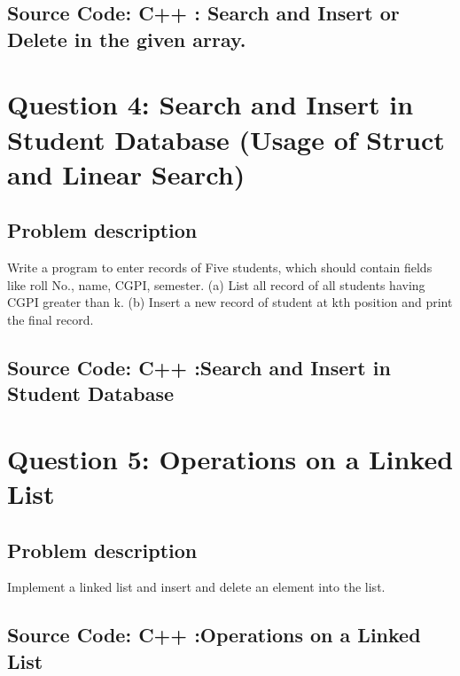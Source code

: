 \documentclass[a4paper]{article}
\begin{document}
\subsection{Source Code: C++ : Search and Insert or Delete in the given array.}


\clearpage

\hspace{-2pt}
\section{\hspace{-0.5em}\textbf{ Question 4}: Search and Insert in Student Database (Usage of Struct and Linear Search)}

\subsection{Problem description}
\large
Write a program to enter records of Five students, which should contain fields like roll No., name, CGPI, semester. (a) List all record of all students having CGPI greater than k. (b) Insert a new record of student at kth position and print the final record.

\subsection{Source Code: C++ :Search and Insert in Student Database}


\clearpage

\hspace{-2pt}
\section{\hspace{-0.5em}\textbf{ Question 5}: Operations on a Linked List}

\subsection{Problem description}
\large
Implement a linked list and insert and delete an element into the list.

\subsection{Source Code: C++ :Operations on a Linked List}

\end{document}
